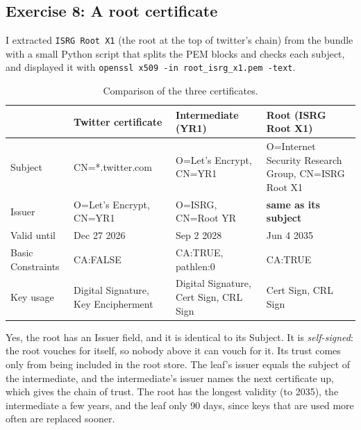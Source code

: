         \subsection{Exercise 8: A root certificate}

            I extracted \texttt{ISRG Root X1} (the root at the top of twitter's chain) from the
            bundle with a small Python script that splits the PEM blocks and checks each
            subject, and displayed it with \texttt{openssl x509 -in root\_isrg\_x1.pem -text}.

            \begin{table}[h]
                \centering
                \small
                \begin{tabular}{p{}p{}p{}p{}}
                    \toprule
                    & Twitter certificate & Intermediate (YR1) & Root (ISRG Root X1) \\
                    \midrule
                    Subject & CN=*.twitter.com & O=Let's Encrypt, CN=YR1 & O=Internet Security Research Group, CN=ISRG Root X1 \\
                    Issuer & O=Let's Encrypt, CN=YR1 & O=ISRG, CN=Root YR & \textbf{same as its subject} \\
                    Valid until & Dec 27 2026 & Sep 2 2028 & Jun 4 2035 \\
                    Basic Constraints & CA:FALSE & CA:TRUE, pathlen:0 & CA:TRUE \\
                    Key usage & Digital Signature, Key Encipherment & Digital Signature, Cert Sign, CRL Sign & Cert Sign, CRL Sign \\
                    \bottomrule
                \end{tabular}
                \caption{Comparison of the three certificates.}
            \end{table}

            Yes, the root has an Issuer field, and it is identical to its Subject. It is
            \emph{self-signed}: the root vouches for itself, so nobody above it can vouch for
            it. Its trust comes only from being included in the root store. The leaf's issuer
            equals the subject of the intermediate, and the intermediate's issuer
            names the next certificate up, which gives the chain of trust. The
            root has the longest validity (to 2035), the intermediate a few years,
            and the leaf only 90 days, since keys that are used more often are replaced sooner.

